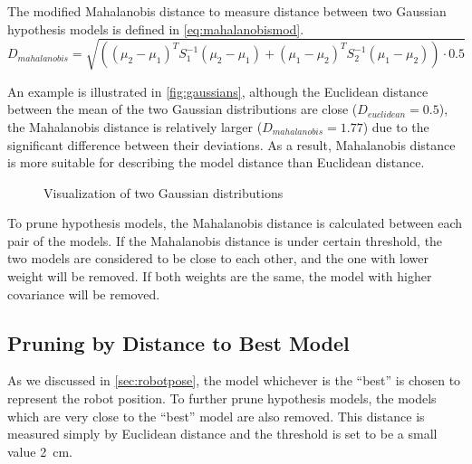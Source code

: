 The modified Mahalanobis distance to measure distance between two Gaussian hypothesis models is defined in \autoref{eq:mahalanobismod}.
\begin{equation}
\label{eq:mahalanobismod}
D_{mahalanobis} = \sqrt{((\mu_2 - \mu_1)^T S_1^{-1} (\mu_2-\mu_1) + (\mu_1 - \mu_2)^T S_2^{-1} (\mu_1-\mu_2)) \cdot 0.5}
\end{equation}

An example is illustrated in \autoref{fig:gaussians}, although the Euclidean distance between the mean of the two Gaussian distributions are close ($D_{euclidean}=0.5$), the Mahalanobis distance is relatively larger ($D_{mahalanobis}=1.77$) due to the significant difference between their deviations. As a result, Mahalanobis distance is more suitable for describing the model distance than Euclidean distance.


\begin{figure}[!htbp]
\begin{center}
  
\end{center}
\caption{Visualization of two Gaussian distributions}
\label{fig:gaussians}
\end{figure}


To prune hypothesis models, the Mahalanobis distance is calculated between each pair of the models. If the Mahalanobis distance is under certain threshold, the two models are considered to be close to each other, and the one with lower weight will be removed. If both weights are the same, the model with higher covariance will be removed.


\subsection{Pruning by Distance to Best Model}
\label{sub:Pruning by Distance to Best Model}

As we discussed in \autoref{sec:robotpose}, the model whichever is the ``best'' is chosen to represent the robot position. To further prune hypothesis models, the models which are very close to the ``best'' model are also removed. This distance is measured simply by Euclidean distance and the threshold is set to be a small value \SI{2}{\cm}.

